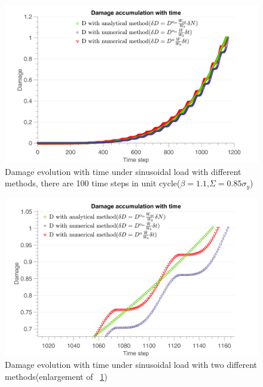 \documentclass[3p,times,procedia,number]{elsarticle}
\newcommand{\figref}[1]{\figurename~\ref{#1}}
\begin{document}
\begin{figure}[!h]
	\centering
	\includegraphics[width=\textwidth]{figures//D_3methods2_100steps.png} 
	\caption{Damage evolution with time under sinusoidal load with different methods, there are 100 time steps in unit cycle($\beta=1.1$,$\Sigma=0.85\sigma_y$)}
	\label{fig.damsin100}
\end{figure}

\begin{figure}[!h]
	\centering
	\includegraphics[width=\textwidth]{figures//D_3methods_100steps_enlarge.png} 
	\caption{Damage evolution with time under sinusoidal load with two different methods(enlargement of \figref{fig.damsin100})}
	\label{damsinenglarge}
\end{figure}
\end{document}
